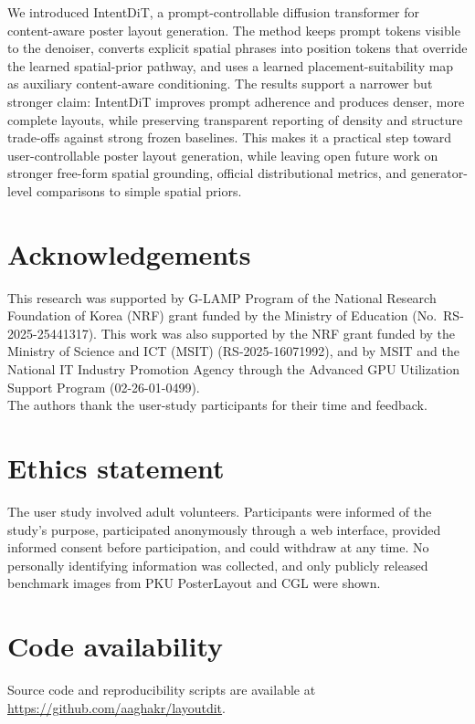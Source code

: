 \documentclass[review]{elsarticle}
\begin{document}
We introduced IntentDiT, a prompt-controllable diffusion transformer for content-aware poster layout generation.
The method keeps prompt tokens visible to the denoiser, converts explicit spatial phrases into position tokens that override the learned spatial-prior pathway, and uses a learned placement-suitability map as auxiliary content-aware conditioning.
The results support a narrower but stronger claim: IntentDiT improves prompt adherence and produces denser, more complete layouts, while preserving transparent reporting of density and structure trade-offs against strong frozen baselines.
This makes it a practical step toward user-controllable poster layout generation, while leaving open future work on stronger free-form spatial grounding, official distributional metrics, and generator-level comparisons to simple spatial priors.

\section*{Acknowledgements}
This research was supported by G-LAMP Program of the National Research Foundation of Korea (NRF) grant funded by the Ministry of Education
(No.~RS-2025-25441317). This work was also supported by the NRF grant funded by the Ministry of Science and ICT (MSIT) (RS-2025-16071992), and by MSIT and the National IT Industry Promotion Agency through the Advanced GPU Utilization Support Program (02-26-01-0499). \\
The authors thank the user-study participants for their time and feedback.

\section*{Ethics statement}
The user study involved adult volunteers.
Participants were informed of the study's purpose, participated anonymously through a web interface, provided informed consent before participation, and could withdraw at any time.
No personally identifying information was collected, and only publicly released benchmark images from PKU PosterLayout and CGL were shown.

\section*{Code availability}
Source code and reproducibility scripts are available at \url{https://github.com/aaghakr/layoutdit}.





\FloatBarrier

\end{document}

